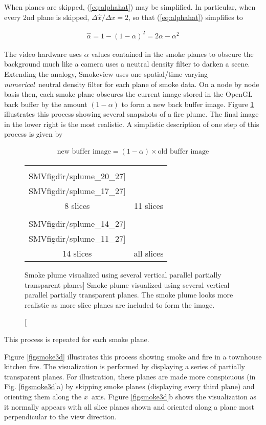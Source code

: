 {When planes are skipped, (\ref{eq:alphahat}) may be simplified.
In particular, when every 2nd plane is skipped,
$\Delta\hat{x}/\Delta x=2$, so that (\ref{eq:alphahat}) simplifies
to

\begin{eqnarray}
\hat{\alpha}=1-(1-\alpha)^2=2\alpha-\alpha^2
\end{eqnarray}

The video hardware uses $\alpha$ values contained in the smoke
planes to obscure the background much like a camera uses a neutral
density filter to darken a scene.  Extending the analogy,
Smokeview uses one spatial/time varying {\em numerical}\ neutral
density filter for each plane of smoke data.  On a node by node
basis then, each smoke plane obscures the current image stored in
the OpenGL back buffer by the amount $(1-\alpha)$ to form a new
back buffer image.  Figure \ref{figplume} illustrates this process
showing several snapshots of a fire plume. The final image in the
lower right is the most realistic. A simplistic description of one
step of this process is given by

\begin{eqnarray}
\mbox{new buffer image} = (1-\alpha)\times \mbox{old buffer image}
\end{eqnarray}

\begin{figure}[bph]
\begin{center}
\begin{tabular}{cc}
\texttt{[image: \\SMVfigdir/splume\_20\_27]}&
\texttt{[image: \\SMVfigdir/splume\_17\_27]}\\
8 slices&11 slices\\
\texttt{[image: \\SMVfigdir/splume\_14\_27]}&
\texttt{[image: \\SMVfigdir/splume\_11\_27]}\\
14 slices&all slices
\end{tabular}
\end{center}
\caption
[Smoke plume visualized using several vertical parallel
partially transparent planes]
{Smoke plume visualized using
several vertical parallel partially transparent planes. The smoke
plume looks more realistic as more slice planes are included to
form the image. } \label{figplume}
\end{figure}

\noindent This process is repeated for each smoke plane.

Figure \ref{figsmoke3d} illustrates this process showing smoke and
fire in a townhouse kitchen fire. The visualization is performed
by displaying a series of partially transparent planes. For
illustration, these planes are made more conspicuous (in Fig.
\ref{figsmoke3d}a) by skipping smoke planes (displaying every
third plane) and orienting them along the $x$~axis. Figure
\ref{figsmoke3d}b shows the visualization as it normally appears
with all slice planes shown and oriented along a plane most
perpendicular to the view direction.

}
